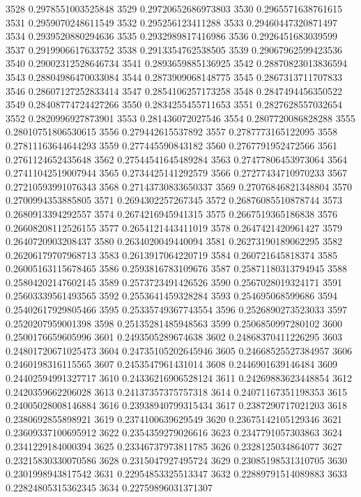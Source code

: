 3528 0.2978551003525848
3529 0.29720652686973803
3530 0.2965571638761615
3531 0.2959070248611549
3532 0.295256123411288
3533 0.29460447320871497
3534 0.2939520880294636
3535 0.2932989817416986
3536 0.2926451683039599
3537 0.2919906617633752
3538 0.2913354762538505
3539 0.29067962599423536
3540 0.29002312528646734
3541 0.2893659885136925
3542 0.28870823013836594
3543 0.28804986470033084
3544 0.2873909068148775
3545 0.2867313711707833
3546 0.28607127252833414
3547 0.2854106257173258
3548 0.2847494456350522
3549 0.28408774724427266
3550 0.2834255455711653
3551 0.2827628557032654
3552 0.2820996927873901
3553 0.281436072027546
3554 0.2807720086828288
3555 0.28010751806530615
3556 0.279442615537892
3557 0.2787773165122095
3558 0.27811163644644293
3559 0.277445590843182
3560 0.2767791952472566
3561 0.2761124652435648
3562 0.27544541645489284
3563 0.27477806453973064
3564 0.27411042519007944
3565 0.2734425141292579
3566 0.27277434710970233
3567 0.27210593991076343
3568 0.27143730833650337
3569 0.27076846821348804
3570 0.2700994353885805
3571 0.2694302257267345
3572 0.26876085510878744
3573 0.2680913394292557
3574 0.2674216945941315
3575 0.2667519365186838
3576 0.26608208112526155
3577 0.2654121443411019
3578 0.2647421420961427
3579 0.2640720903208437
3580 0.2634020049440094
3581 0.26273190189062295
3582 0.26206179707968713
3583 0.2613917064220719
3584 0.260721645818374
3585 0.26005163115678465
3586 0.2593816783109676
3587 0.25871180313794945
3588 0.25804202147602145
3589 0.2573723491426526
3590 0.2567028019324171
3591 0.25603339561493565
3592 0.2553641459328284
3593 0.254695068599686
3594 0.25402617929805466
3595 0.25335749367743554
3596 0.2526890273523033
3597 0.2520207959001398
3598 0.25135281485948563
3599 0.2506850997280102
3600 0.2500176659605996
3601 0.2493505289674638
3602 0.24868370411226295
3603 0.24801720671025473
3604 0.24735105202645946
3605 0.24668525527384957
3606 0.2460198316115565
3607 0.2453547961431014
3608 0.2446901639146484
3609 0.24402594991327717
3610 0.24336216906528124
3611 0.24269883623448854
3612 0.2420359662206028
3613 0.24137357375757318
3614 0.24071167351198353
3615 0.24005028008146884
3616 0.23938940799315434
3617 0.2387290717021203
3618 0.2380692855898921
3619 0.2374100639629549
3620 0.23675142105129346
3621 0.23609337100695912
3622 0.2354359279026616
3623 0.2347791057303863
3624 0.2341229184000394
3625 0.23346737973811785
3626 0.2328125034864077
3627 0.23215830330070586
3628 0.2315047927495724
3629 0.23085198531310705
3630 0.2301998943817542
3631 0.22954853325513347
3632 0.22889791514089883
3633 0.22824805315362345
3634 0.22759896031371307
